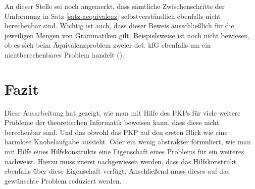 \documentclass[]{scrartcl}
\begin{document}
		An dieser Stelle sei noch angemerkt, dass sämtliche Zwischenschritte der Umformung in Satz \ref{satz-aequivalenz} selbstverständlich ebenfalls nicht berechenbar sind. Wichtig ist auch, dass dieser Beweis ausschließlich für die jeweiligen Mengen von Grammatiken gilt. Beispielsweise ist noch nicht bewiesen, ob es sich beim Äquivalenzproblem zweier det. kfG ebenfalls um ein nichtberechenbares Problem handelt (\cite{schoening}).

\section{Fazit}

	Diese Ausarbeitung hat gezeigt, wie man mit Hilfe des PKPs für viele weitere Probleme der theoretischen Informatik beweisen kann, dass diese nicht berechenbar sind. Und das obwohl das PKP auf den ersten Blick wie eine harmlose Knobelaufgabe aussieht. Oder ein wenig abstrakter formuliert, wie man mit Hilfe eines Hilfskonstrukts eine Eigenschaft eines Problems für ein weiteres nachweist. Hierzu muss zuerst nachgewiesen werden, dass das Hilfskonstrukt ebenfalls über diese Eigenschaft verfügt. Anschließend muss dieses auf das gewünschte Problem reduziert werden.

\def\refname{Literaturverzeichnis}
\printbibliography    
\end{document}
